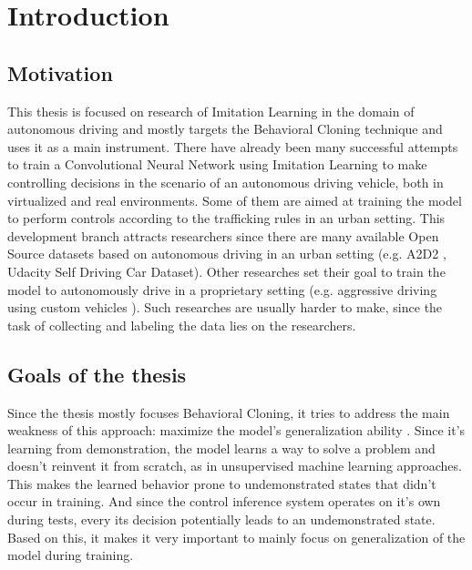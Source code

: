 \chapter{Introduction}
\label{cha:Introduction}

\section{Motivation}

This thesis is focused on research of Imitation Learning in the domain of autonomous driving and mostly targets the Behavioral Cloning technique and uses it as a main instrument. There have already been many successful attempts to train a Convolutional Neural Network using Imitation Learning to make controlling decisions in the scenario of an autonomous driving vehicle, both in virtualized \autocite{8855753} and real \autocite{pan2019agileautonomousdrivingusing} \autocite{bojarski2016endendlearningselfdriving} environments. Some of them are aimed at training the model to perform controls according to the trafficking rules in an urban setting. This development branch attracts researchers since there are many available Open Source datasets based on autonomous driving in an urban setting (e.g. A2D2 \autocite{geyer2020a2d2audiautonomousdriving}, Udacity Self Driving Car Dataset). Other researches set their goal to train the model to autonomously drive in a proprietary setting (e.g. aggressive driving using custom vehicles \autocite{drews2017aggressivedeepdrivingmodel}). Such researches are usually harder to make, since the task of collecting and labeling the data lies on the researchers.

\section{Goals of the thesis}

Since the thesis mostly focuses Behavioral Cloning, it tries to address the main weakness of this approach: maximize the model's generalization ability \autocite{ARGALL2009469}. Since it's learning from demonstration, the model learns a way to solve a problem and doesn't reinvent it from scratch, as in unsupervised machine learning approaches. This makes the learned behavior prone to undemonstrated states that didn't occur in training. And since the control inference system operates on it's own during tests, every its decision potentially leads to an undemonstrated state. Based on this, it makes it very important to mainly focus on generalization of the model during training.

